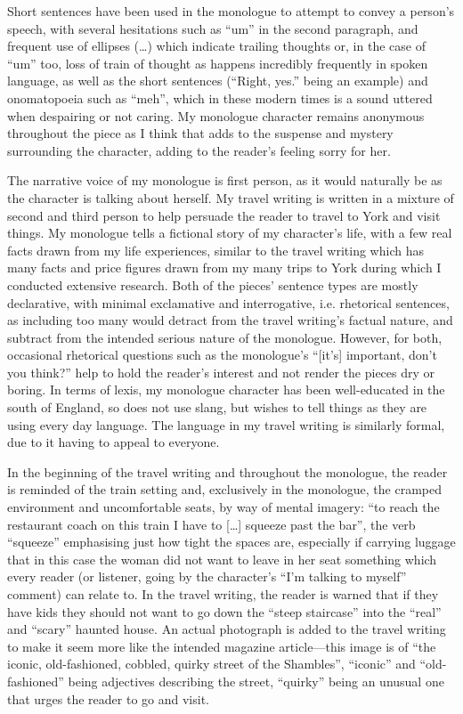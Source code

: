 \documentclass[11pt,a4paper]{article}
\begin{document}
Short sentences have been used in the monologue to attempt to convey a person's speech, with several hesitations such as ``um'' in the second paragraph, and frequent use of ellipses (\ldots) which indicate trailing thoughts or, in the case of ``um'' too, loss of train of thought as happens incredibly frequently in spoken language, as well as the short sentences (``Right, yes.'' being an example) and onomatopoeia such as ``meh'', which in these modern times is a sound uttered when despairing or not caring.  My monologue character remains anonymous throughout the piece as I think that adds to the suspense and mystery surrounding the character, adding to the reader's feeling sorry for her.

The narrative voice of my monologue is first person, as it would naturally
be as the character is talking about herself.  My travel writing is written
in a mixture of second and third person to help persuade the reader to
travel to York and visit things.  My monologue tells a fictional story of
my character's life, with a few real facts drawn from my life experiences,
similar to the travel writing which has many facts and price figures drawn
from my many trips to York during which I conducted extensive research.
Both of the pieces' sentence types are mostly declarative, with minimal exclamative and interrogative, i.e. rhetorical sentences, as including too many would detract from the travel writing's factual nature, and subtract from the intended serious nature of the monologue.  However, for both, occasional rhetorical questions such as the monologue's ``[it's] important, don't you think?'' help to hold the reader's interest and not render the pieces dry or boring.  In terms of lexis, my monologue character has been well-educated in the south of England, so does not use slang, but wishes to tell things as they are using every day language.  The language in my travel writing is similarly formal, due to it having to appeal to everyone.

In the beginning of the travel writing and throughout the monologue, the reader is reminded of the train setting and, exclusively in the monologue, the cramped environment and uncomfortable seats, by way of mental imagery: ``to reach the restaurant coach on this train I have to [\ldots] squeeze past the bar'', the verb ``squeeze'' emphasising just how tight the spaces are, especially if carrying luggage that in this case the woman did not want to leave in her seat something which every reader (or listener, going by the character's ``I'm talking to myself'' comment) can relate to.  In the travel writing, the reader is warned that if they have kids they should not want to go down the ``steep staircase'' into the ``real'' and ``scary'' haunted house.  An actual photograph is added to the travel writing to make it seem more like the intended magazine article---this image is of ``the iconic, old-fashioned, cobbled, quirky street of the Shambles'', ``iconic'' and ``old-fashioned'' being adjectives describing the street, ``quirky'' being an unusual one that urges the reader to go and visit.
\end{document}
